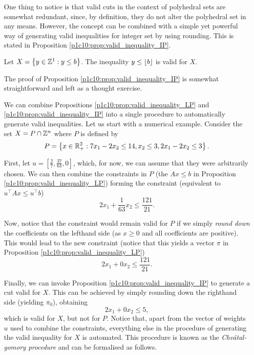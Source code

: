 One thing to notice is that valid cuts in the context of polyhedral sets are somewhat redundant, since, by definition, they do not alter the polyhedral set in any means. However, the concept can be combined with a simple yet powerful way of generating valid inequalities for integer set by using rounding. This is stated in Proposition \ref{p1c10:prop:valid_inequality_IP}. 
%
\begin{proposition} \label{p1c10:prop:valid_inequality_IP}
	Let $X = \left\{ y \in \mathbb{Z}^1 : y \leq b \right \}$. The inequality $y \leq \lfloor b \rfloor$ is valid for $X$.
\end{proposition}
%
The proof of Proposition \ref{p1c10:prop:valid_inequality_IP} is somewhat straightforward and left as a thought exercise. 

We can combine Propositions \ref{p1c10:prop:valid_inequality_LP} and \ref{p1c10:prop:valid_inequality_IP} into a single procedure to automatically generate valid inequalities. Let us start with a numerical example. Consider the set $X = P \cap \mathbb{Z}^n$ where $P$ is defined by
	\begin{equation*}
		P = \left\{ x \in \mathbb{R}^2_+ : 7x_1 -2x_2 \leq 14, x_2 \leq 3, 2x_1 - 2x_2 \leq 3 \right \}.
	\end{equation*}
	
First, let $u=\left[\frac{2}{7}, \frac{37}{63}, 0\right]$, which, for now, we can assume that they were arbitrarily chosen. We can then combine the constraints in $P$ (the $Ax \le b$ in Proposition \ref{p1c10:prop:valid_inequality_LP}) forming the constraint (equivalent to $u^\top Ax \le u^\top b$)
	\begin{equation*}
		2x_1 + \frac{1}{63}x_2 \leq \frac{121}{21}.
	\end{equation*}
	
Now, notice that the constraint would remain valid for $P$ if we simply \emph{round down} the coefficients on the lefthand side (as $x \ge 0$ and all coefficients are positive). This would lead to the new constraint (notice that this yields a vector $\pi$ in Proposition \ref{p1c10:prop:valid_inequality_LP})
	\begin{equation*}
		2x_1 + 0x_2 \leq \frac{121}{21}.
	\end{equation*}
	
Finally, we can invoke Proposition \ref{p1c10:prop:valid_inequality_IP} to generate a cut valid for $X$. This can be achieved by simply rounding down the righthand side (yielding $\pi_0$), obtaining
	\begin{equation*}
		2x_1 + 0x_2 \leq 5,
	\end{equation*}
	which is valid for $X$, but not for $P$. Notice that, apart from the vector of weights $u$ used to combine the constraints, everything else in the procedure of generating the valid inequality for $X$ is automated. This procedure is known as the \emph{Chv\'atal-gomory procedure} and can be formalised as follows.
	
